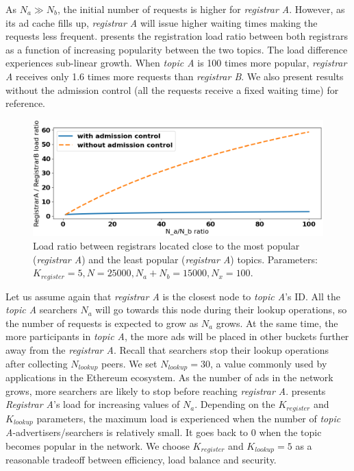 As $N_a \gg N_b$, the initial number of requests is higher for \emph{registrar A}.
However, as its ad cache fills up, \emph{registrar A} will issue higher waiting times making the requests less frequent.
 presents the registration load ratio between both registrars as a function of increasing popularity between the two topics.
The load difference experiences sub-linear growth.
When \emph{topic A} is 100 times more popular, \emph{registrar A} receives only 1.6 times more requests than \emph{registrar B}.
We also present results without the admission control (\ie all the requests receive a fixed waiting time) for reference.

\begin{figure}[t]
    \includegraphics[width=1\linewidth]{img/fairness_registration}
    \vspace{-0.05in}
    \caption{Load ratio between registrars located close to the most popular (\emph{registrar A}) and the least popular (\emph{registrar A}) topics.
	\protect{} Parameters: $K_\textit{register}=5, N=25000, N_a+N_b=15000, N_x=100$.}
    \label{fig:fairness_registration}
    \vspace{-0.15in}
\end{figure}

Let us assume again that \emph{registrar A} is the closest node to \emph{topic A}'s ID.
All the \emph{topic A} searchers $N_a$ will go towards this node during their lookup operations, so the number of requests is expected to grow as $N_a$ grows.
At the same time, the more participants in \emph{topic A}, the more ads will be placed in other buckets further away from the \emph{registrar A}.
Recall that searchers stop their lookup operations after collecting $N_\textit{lookup}$ peers. 
We set $N_\textit{lookup} = 30$, a value commonly used by applications in the Ethereum ecosystem. As the number of ads in the network grows, more searchers are likely to stop before reaching \emph{registrar A}.
 presents \emph{Registrar A}'s load for increasing values of $N_a$. 
Depending on the $K_\textit{register}$ and $K_\textit{lookup}$ parameters, the maximum load is experienced when the number of \emph{topic A}-advertisers/searchers is relatively small.
It goes back to $0$ when the topic becomes popular in the network.
We choose $K_\textit{register}$ and $K_\textit{lookup} =5$ as a reasonable tradeoff between efficiency, load balance and security.

